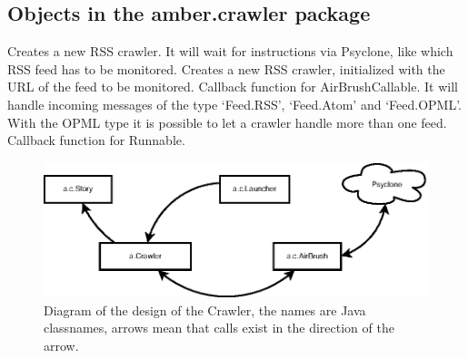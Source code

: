 \subsection{Objects in the amber.crawler package}




\begin{classmetadata}
\end{classmetadata}

\begin{interface}
    {Creates a new RSS crawler. It will wait for instructions via Psyclone,
      like which RSS feed has to be monitored.}
    {Creates a new RSS crawler, initialized with the URL of the feed to be
      monitored.}
    {Callback function for AirBrushCallable. It will handle incoming messages
        of the type `Feed.RSS', `Feed.Atom' and `Feed.OPML'. With the OPML type
        it is possible to let a crawler handle more than one feed.}
    {Callback function for Runnable.}
\end{interface}

\begin{figure}
  \centering
  \includegraphics{image/crawler}
  \caption{
    Diagram of the design of the Crawler, the names are Java classnames, arrows
    mean that calls exist in the direction of the arrow.
  }
\end{figure}

